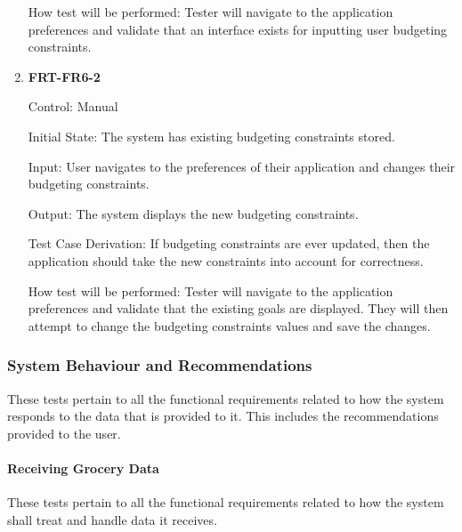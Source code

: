 \documentclass[12pt, titlepage]{article}
\begin{document}
\begin{enumerate}
How test will be performed: Tester will navigate to the application preferences and validate that an interface exists for inputting user budgeting constraints.

\item{\textbf{FRT-FR6-2}}

Control: Manual
          
Initial State: The system has existing budgeting constraints stored.

Input: User navigates to the preferences of their application and changes their budgeting constraints.
          
Output: The system displays the new budgeting constraints.

Test Case Derivation: If budgeting constraints are ever updated, then the application should take the new constraints into account
for correctness.

How test will be performed: Tester will navigate to the application preferences and validate that the existing goals are displayed. They will then attempt to change the budgeting constraints values and save the changes.

\end{enumerate}

\subsubsection{System Behaviour and Recommendations}

These tests pertain to all the functional requirements related to how the system responds to the data that is provided to it. This includes the recommendations provided to the user.

\paragraph{Receiving Grocery Data}

These tests pertain to all the functional requirements related to how the system shall treat and handle data it receives.
\end{document}
